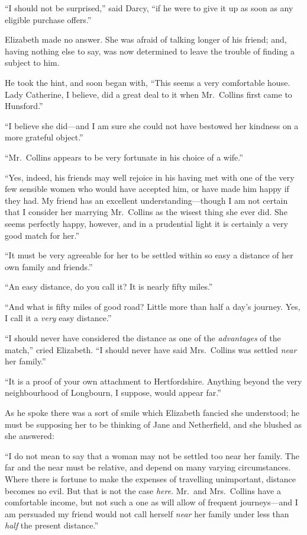 \documentclass[12pt,english,oneside]{book}
\begin{document}
{}``I should not be surprised,'' said Darcy, {}``if he were to
give it up as soon as any eligible purchase offers.''

Elizabeth made no answer. She was afraid of talking longer of his
friend; and, having nothing else to say, was now determined to leave
the trouble of finding a subject to him.

He took the hint, and soon began with, {}``This seems a very comfortable
house. Lady Catherine, I believe, did a great deal to it when Mr.\ Collins
first came to Hunsford.''

{}``I believe she did\mbox{---}and I am sure she could not have
bestowed her kindness on a more grateful object.''

{}``Mr.\ Collins appears to be very fortunate in his choice of a
wife.''

{}``Yes, indeed, his friends may well rejoice in his having met with
one of the very few sensible women who would have accepted him, or
have made him happy if they had. My friend has an excellent understanding\mbox{---}though
I am not certain that I consider her marrying Mr.\ Collins as the
wisest thing she ever did. She seems perfectly happy, however, and
in a prudential light it is certainly a very good match for her.''

{}``It must be very agreeable for her to be settled within so easy
a distance of her own family and friends.''

{}``An easy distance, do you call it? It is nearly fifty miles.''

{}``And what is fifty miles of good road? Little more than half a
day's journey. Yes, I call it a \textit{very} easy distance.''

{}``I should never have considered the distance as one of the \textit{advantages}
of the match,'' cried Elizabeth. {}``I should never have said Mrs.\ Collins
was settled \textit{near} her family.''

{}``It is a proof of your own attachment to Hertfordshire. Anything
beyond the very neighbourhood of Longbourn, I suppose, would appear
far.''

As he spoke there was a sort of smile which Elizabeth fancied she
understood; he must be supposing her to be thinking of Jane and Netherfield,
and she blushed as she answered:

{}``I do not mean to say that a woman may not be settled too near
her family. The far and the near must be relative, and depend on many
varying circumstances. Where there is fortune to make the expenses
of travelling unimportant, distance becomes no evil. But that is not
the case \textit{here}. Mr.\ and Mrs.\ Collins have a comfortable
income, but not such a one as will allow of frequent journeys\mbox{---}and
I am persuaded my friend would not call herself \textit{near} her
family under less than \textit{half} the present distance.''
\end{document}
